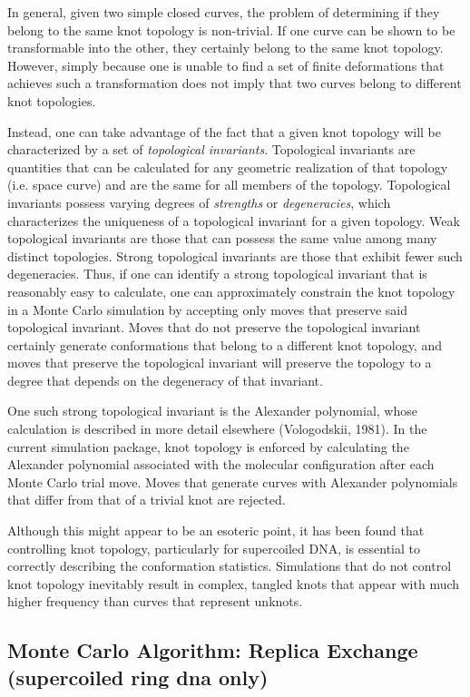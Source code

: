 \documentclass[english]{article}
\begin{document}
In general, given two simple closed curves, the problem of determining if they belong to the same knot topology is non-trivial. If one curve can be shown to be transformable into the other, they certainly belong to the same knot topology. However, simply because one is unable to find a set of finite deformations that achieves such a transformation does not imply that two curves belong to different knot topologies. 

Instead, one can take advantage of the fact that a given knot topology will be characterized by a set of \emph{topological invariants}. Topological invariants are quantities that can be calculated for any geometric realization of that topology (i.e. space curve) and are the same for all members of the topology. Topological invariants possess varying degrees of \emph{strengths} or \emph{degeneracies}, which characterizes the uniqueness of a topological invariant for a given topology. Weak topological invariants are those that can possess the same value among many distinct topologies. Strong topological invariants are those that exhibit fewer such degeneracies. Thus, if one can identify a strong topological invariant that is reasonably easy to calculate, one can approximately constrain the knot topology in a Monte Carlo simulation by accepting only moves that preserve said topological invariant. Moves that do not preserve the topological invariant certainly generate conformations that belong to a different knot topology, and moves that preserve the topological invariant will preserve the topology to a degree that depends on the degeneracy of that invariant.

One such strong topological invariant is the Alexander polynomial, whose calculation is described in more detail elsewhere (Vologodskii, 1981). In the current simulation package, knot topology is enforced by calculating the Alexander polynomial associated with the molecular configuration after each Monte Carlo trial move. Moves that generate curves with Alexander polynomials that differ from that of a trivial knot are rejected.

Although this might appear to be an esoteric point, it has been found that controlling knot topology, particularly for supercoiled DNA, is essential to correctly describing the conformation statistics. Simulations that do not control knot topology inevitably result in complex, tangled knots that appear with much higher frequency than curves that represent unknots.

\subsection{Monte Carlo Algorithm: Replica Exchange (supercoiled ring dna only)} \label{replica exchange}
\end{document}
